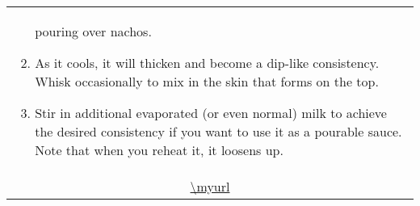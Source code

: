 \documentclass[../web-recipes.tex]{subfiles}
\begin{document}
\begin{tabular}{l}
\begin{minipage}[t]{0.55\textwidth}
\begin{enumerate}
          pouring over nachos.
        \item As it cools, it will thicken and become a dip-like consistency.
          Whisk occasionally to mix in the skin that forms on the top.
        \item Stir in additional evaporated (or even normal) milk to achieve
          the desired consistency if you want to use it as a pourable sauce.
          Note that when you reheat it, it loosens up.
      \end{enumerate}
    \end{minipage} \vspace{3ex}\\
    \multicolumn{1}{c}{\small\ttfamily \url{\myurl}} \\
  \end{tabular}
\end{document}
